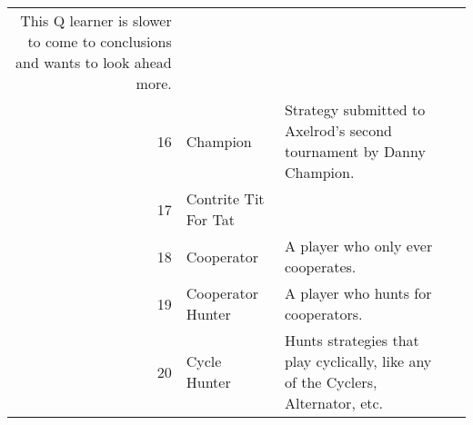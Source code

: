 \begin{table}[H]
\begin{adjustbox}{height=0.8\textwidth, width=1.1\textwidth}
\begin{tabular}{rlll}
	This Q learner is slower to come to conclusions and wants to look ahead more.                                                                                                                                                                                                                                                                                                                                                                                                                                                                                                                                                                                                                                                                                                                                                                                                                                                             \\
	16   & Champion                    & Strategy submitted to Axelrod's second tournament by Danny Champion.                                                              \\
	17   & Contrite Tit For Tat        &                                                                                                                                   \\
	18   & Cooperator                  & A player who only ever cooperates.                                                                                                \\
	19   & Cooperator Hunter           & A player who hunts for cooperators.                                                                                               \\
	20   & Cycle Hunter                & Hunts strategies that play cyclically, like any of the Cyclers,
	                                       Alternator, etc.                                                                                                                                                                                                                                                                                                                                                                                                                                                                                                                                                                                                                                                                                                                                                                                                                                                                                                                                     \\

\end{tabular}
\end{adjustbox}
\end{table}

